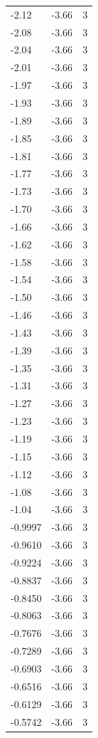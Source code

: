 \begin{longtable}{lrr}
  -2.12 & -3.66 & 3 \\
  -2.08 & -3.66 & 3 \\
  -2.04 & -3.66 & 3 \\
  -2.01 & -3.66 & 3 \\
  -1.97 & -3.66 & 3 \\
  -1.93 & -3.66 & 3 \\
  -1.89 & -3.66 & 3 \\
  -1.85 & -3.66 & 3 \\
  -1.81 & -3.66 & 3 \\
  -1.77 & -3.66 & 3 \\
  -1.73 & -3.66 & 3 \\
  -1.70 & -3.66 & 3 \\
  -1.66 & -3.66 & 3 \\
  -1.62 & -3.66 & 3 \\
  -1.58 & -3.66 & 3 \\
  -1.54 & -3.66 & 3 \\
  -1.50 & -3.66 & 3 \\
  -1.46 & -3.66 & 3 \\
  -1.43 & -3.66 & 3 \\
  -1.39 & -3.66 & 3 \\
  -1.35 & -3.66 & 3 \\
  -1.31 & -3.66 & 3 \\
  -1.27 & -3.66 & 3 \\
  -1.23 & -3.66 & 3 \\
  -1.19 & -3.66 & 3 \\
  -1.15 & -3.66 & 3 \\
  -1.12 & -3.66 & 3 \\
  -1.08 & -3.66 & 3 \\
  -1.04 & -3.66 & 3 \\
  -0.9997 & -3.66 & 3 \\
  -0.9610 & -3.66 & 3 \\
  -0.9224 & -3.66 & 3 \\
  -0.8837 & -3.66 & 3 \\
  -0.8450 & -3.66 & 3 \\
  -0.8063 & -3.66 & 3 \\
  -0.7676 & -3.66 & 3 \\
  -0.7289 & -3.66 & 3 \\
  -0.6903 & -3.66 & 3 \\
  -0.6516 & -3.66 & 3 \\
  -0.6129 & -3.66 & 3 \\
  -0.5742 & -3.66 & 3 \\

\end{longtable}
